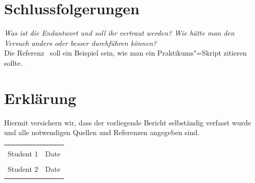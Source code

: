 \documentclass[12pt,a4paper]{scrartcl}
\begin{document}
\section{Schlussfolgerungen}
\label{sec:Schlussf}
%
\textit{Was ist die Endantwort und soll ihr vertraut werden?  Wie hätte man den Versuch anders oder besser durchführen können?}\\
Die Referenz~\cite{GP1StromSpannung} soll ein Beispiel sein, wie man ein Praktikums"=Skript zitieren sollte. 
%

\section*{Erklärung}

Hiermit versichern wir, dass der vorliegende Bericht selbständig verfasst wurde und alle notwendigen Quellen und Referenzen angegeben sind.

\begin{tabular}{@{}p{2.5in}p{2.5in}@{}}
 \\[5\bigskipamount]
  \dotfill & \dotfill \\
  Student 1 & Date \\[5\bigskipamount]
  \dotfill & \dotfill \\
 Student 2 & Date \\
  \centering
  
\end{tabular}

%

%
%
\end{document}
